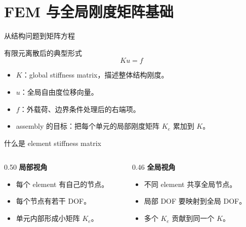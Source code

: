 \section{FEM 与全局刚度矩阵基础}

\begin{frame}{从结构问题到矩阵方程}
\begin{block}{有限元离散后的典型形式}
$$K u = f$$
\end{block}
\begin{itemize}
  \item $K$：global stiffness matrix，描述整体结构刚度。
  \item $u$：全局自由度位移向量。
  \item $f$：外载荷、边界条件处理后的右端项。
  \item assembly 的目标：把每个单元的局部刚度矩阵 $K_e$ 累加到 $K$。
\end{itemize}
\end{frame}

\begin{frame}{什么是 element stiffness matrix}
\begin{columns}[T,onlytextwidth]
\begin{column}{0.50\textwidth}
\textbf{局部视角}
\begin{itemize}
  \item 每个 element 有自己的节点。
  \item 每个节点有若干 DOF。
  \item 单元内部形成小矩阵 $K_e$。
\end{itemize}
\end{column}
\begin{column}{0.46\textwidth}
\textbf{全局视角}
\begin{itemize}
  \item 不同 element 共享全局节点。
  \item 局部 DOF 要映射到全局 DOF。
  \item 多个 $K_e$ 贡献到同一个 $K$。
\end{itemize}
\end{column}
\end{columns}
\end{frame}

